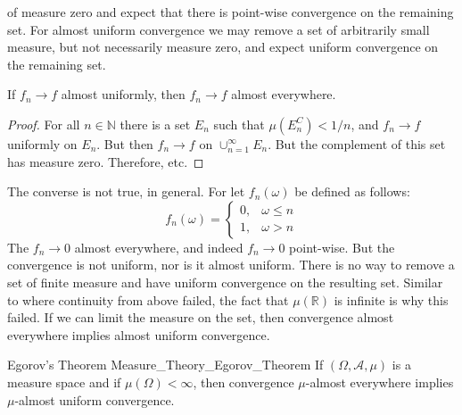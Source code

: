 \documentclass[crop=false,class=book,oneside]{standalone}
\begin{document}
        of measure zero and expect that there is point-wise
        convergence on the remaining set. For almost uniform
        convergence we may remove a set of arbitrarily small
        measure, but not necessarily measure zero, and expect
        uniform convergence on the remaining set.
        \begin{theorem}
            If $f_{n}\rightarrow{f}$ almost uniformly,
            then $f_{n}\rightarrow{f}$ almost everywhere.
        \end{theorem}
        \begin{proof}
            For all $n\in\mathbb{N}$ there is a set
            $E_{n}$ such that $\mu(E_{n}^{C})<1/n$, and
            $f_{n}\rightarrow{f}$ uniformly on $E_{n}$.
            But then $f_{n}\rightarrow{f}$ on
            $\cup_{n=1}^{\infty}E_{n}$. But the complement
            of this set has measure zero. Therefore, etc.
        \end{proof}
        The converse is not true, in general. For let
        $f_{n}(\omega)$ be defined as follows:
        \begin{equation}
            f_{n}(\omega)=
            \begin{cases}
                0,&\omega\leq{n}\\
                1,&\omega>n
            \end{cases}
        \end{equation}
        The $f_{n}\rightarrow{0}$ almost everywhere, and
        indeed $f_{n}\rightarrow{0}$ point-wise. But
        the convergence is not uniform, nor is it
        almost uniform. There is no way to remove a set of
        finite measure and have uniform convergence on the
        resulting set. Similar to where continuity from above
        failed, the fact that $\mu(\mathbb{R})$ is infinite
        is why this failed. If we can limit the measure on
        the set, then convergence almost everywhere implies
        almost uniform convergence.
        \begin{ftheorem}{Egorov's Theorem}
                        {Measure_Theory_Egorov_Theorem}
            If $(\Omega,\mathcal{A},\mu)$ is a measure
            space and if $\mu(\Omega)<\infty$, then
            convergence $\mu$-almost everywhere implies
            $\mu$-almost uniform convergence.
        \end{ftheorem}
\end{document}
